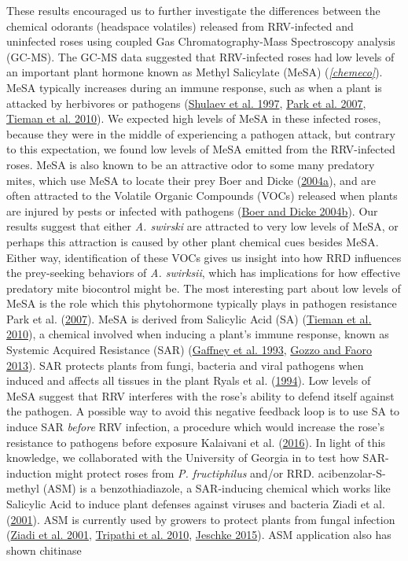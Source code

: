 \documentclass{ufdissertation}[overrideChapters] %
\begin{document}
{These results encouraged us to further investigate the differences between the chemical odorants (headspace volatiles) released from RRV-infected and uninfected roses using coupled Gas Chromatography-Mass Spectroscopy analysis (GC-MS). The GC-MS data suggested that RRV-infected roses had low levels of an important plant hormone known as Methyl Salicylate (MeSA) (\emph{\ref{chemeco}}). MeSA typically increases during an immune response, such as when a plant is attacked by herbivores or pathogens (\protect\hyperlink{ref-Shulaev1997}{Shulaev et al. 1997}, \protect\hyperlink{ref-Park2007}{Park et al. 2007}, \protect\hyperlink{ref-Tieman2010}{Tieman et al. 2010}). We expected high levels of MeSA in these infected roses, because they were in the middle of experiencing a pathogen attack, but contrary to this expectation, we found low levels of MeSA emitted from the RRV-infected roses. MeSA is also known to be an attractive odor to some many predatory mites, which use MeSA to locate their prey Boer and Dicke (\protect\hyperlink{ref-Boer2004a}{2004a}), and are often attracted to the Volatile Organic Compounds (VOCs) released when plants are injured by pests or infected with pathogens (\protect\hyperlink{ref-Boer2004b}{Boer and Dicke 2004b}). Our results suggest that either \emph{A. swirski} are attracted to very low levels of MeSA, or perhaps this attraction is caused by other plant chemical cues besides MeSA. Either way, identification of these VOCs gives us insight into how RRD influences the prey-seeking behaviors of \emph{A. swirksii}, which has implications for how effective predatory mite biocontrol might be. The most interesting part about low levels of MeSA is the role which this phytohormone typically plays in pathogen resistance Park et al. (\protect\hyperlink{ref-Park2007}{2007}). MeSA is derived from Salicylic Acid (SA) (\protect\hyperlink{ref-Tieman2010}{Tieman et al. 2010}), a chemical involved when inducing a plant's immune response, known as Systemic Acquired Resistance (SAR) (\protect\hyperlink{ref-Gaffney1993}{Gaffney et al. 1993}, \protect\hyperlink{ref-Gozzo2013}{Gozzo and Faoro 2013}). SAR protects plants from fungi, bacteria and viral pathogens when induced and affects all tissues in the plant Ryals et al. (\protect\hyperlink{ref-Ryals1994}{1994}). Low levels of MeSA suggest that RRV interferes with the rose's ability to defend itself against the pathogen. A possible way to avoid this negative feedback loop is to use SA to induce SAR \emph{before} RRV infection, a procedure which would increase the rose's resistance to pathogens before exposure Kalaivani et al. (\protect\hyperlink{ref-Kalaivani2016}{2016}). In light of this knowledge, we collaborated with the University of Georgia in to test how SAR-induction might protect roses from \emph{P. fructiphilus} and/or RRD. acibenzolar-S-methyl (ASM) is a benzothiadiazole, a SAR-inducing chemical which works like Salicylic Acid to induce plant defenses against viruses and bacteria Ziadi et al. (\protect\hyperlink{ref-Ziadi2001}{2001}). ASM is currently used by growers to protect plants from fungal infection (\protect\hyperlink{ref-Ziadi2001}{Ziadi et al. 2001}, \protect\hyperlink{ref-Tripathi2010}{Tripathi et al. 2010}, \protect\hyperlink{ref-Jeschke2015}{Jeschke 2015}). ASM application also has shown chitinase }
\end{document}
